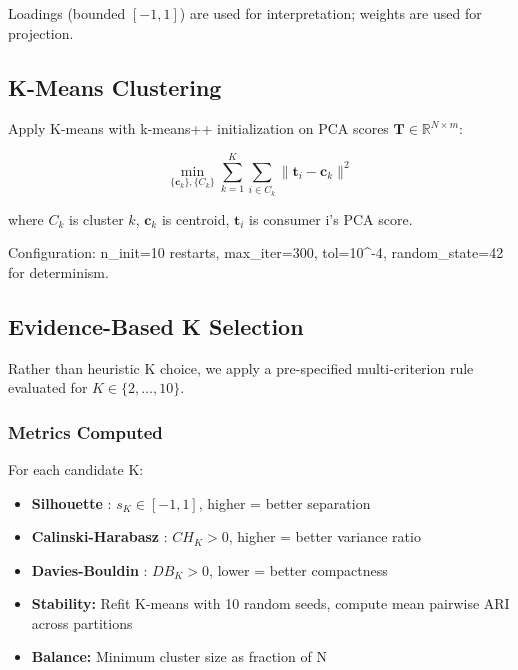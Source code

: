 \documentclass[11pt,a4paper]{article}
\begin{document}
Loadings (bounded $[-1, 1]$) are used for interpretation; weights are used for projection.

\subsection{K-Means Clustering}
\label{sec:kmeans}

Apply K-means \cite{lloyd1982least} with k-means++ initialization \cite{arthur2007kmeans} on PCA scores $\mathbf{T} \in \mathbb{R}^{N \times m}$:

\begin{equation}
\min_{\{\mathbf{c}_k\}, \{C_k\}} \sum_{k=1}^{K} \sum_{i \in C_k} \| \mathbf{t}_i - \mathbf{c}_k \|^2
\end{equation}

where $C_k$ is cluster $k$, $\mathbf{c}_k$ is centroid, $\mathbf{t}_i$ is consumer i's PCA score.

Configuration: n\_init=10 restarts, max\_iter=300, tol=10^{-4}, random\_state=42 for determinism.

\subsection{Evidence-Based K Selection}
\label{sec:kselection}

Rather than heuristic K choice, we apply a pre-specified multi-criterion rule evaluated for $K \in \{2, \ldots, 10\}$.

\subsubsection{Metrics Computed}

For each candidate K:
\begin{itemize}
    \item \textbf{Silhouette} \cite{rousseeuw1987silhouettes}: $s_K \in [-1, 1]$, higher = better separation
    \item \textbf{Calinski-Harabasz} \cite{calinski1974dendrite}: $CH_K > 0$, higher = better variance ratio
    \item \textbf{Davies-Bouldin} \cite{davies1979cluster}: $DB_K > 0$, lower = better compactness
    \item \textbf{Stability:} Refit K-means with 10 random seeds, compute mean pairwise ARI across partitions
    \item \textbf{Balance:} Minimum cluster size as fraction of N
\end{itemize}
\end{document}
